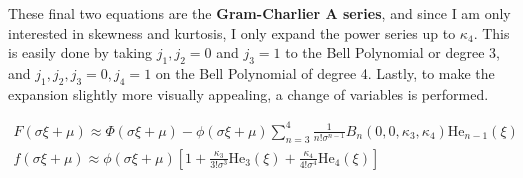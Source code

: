 These final two equations are the \textbf{Gram-Charlier A series}, and since I am only interested in skewness and kurtosis, I only expand the power series up to $\kappa_4$. This is easily done by taking \(j_1, j_2 = 0\) and \(j_3 = 1 \) to the Bell Polynomial or degree 3, and \(j_1, j_2, j_3 = 0, j_4 = 1\) on the Bell Polynomial of degree 4. Lastly, to make the expansion slightly more visually appealing, a change of variables is performed.

\begin{gather*}
	F(\sigma \xi + \mu) \approx \Phi(\sigma \xi + \mu) - \phi(\sigma \xi + \mu) \sum_{n=3}^{4} \frac{1}{n! \sigma^{n-1}} B_n(0, 0, \kappa_3, \kappa_4) \text{He}_{n-1} (\xi) \\
	f(\sigma \xi + \mu) \approx \phi(\sigma \xi + \mu) \left[ 1 + \frac{\kappa_3}{3! \sigma^3} \text{He}_{3}(\xi) + \frac{\kappa_4}{4!{\sigma^4}} \text{He}_4(\xi) \right]
\end{gather*}
